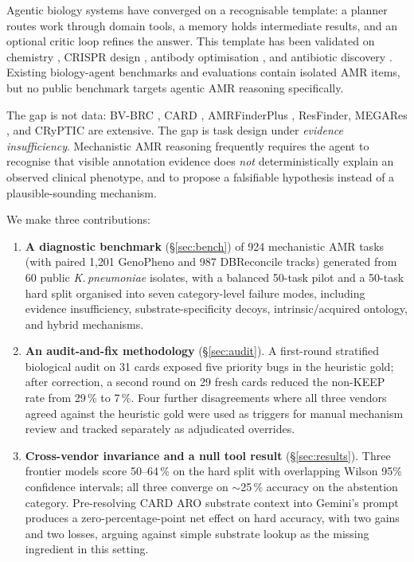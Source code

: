 \documentclass{article}
\begin{document}
Agentic biology systems
\cite{coscientist,chemcrow,biomni,virtuallab,robin,saga,cocientist,txagent}
have converged on a recognisable template: a planner routes work through
domain tools, a memory holds intermediate results, and an optional critic
loop refines the answer. This template has been validated on chemistry
\cite{chemcrow}, CRISPR design \cite{biodiscoveryagent}, antibody
optimisation \cite{virtuallab}, and antibiotic discovery
\cite{saga}. Existing biology-agent benchmarks and evaluations
\cite{labbench,bixbench,biomni,scienceagentbench,bioplanner,astabench,genentech_agentic_compbio}
contain isolated AMR items, but no public benchmark targets agentic AMR
reasoning specifically.

The gap is not data: BV-BRC \cite{bvbrc}, CARD \cite{card}, AMRFinderPlus
\cite{amrfinder}, ResFinder, MEGARes \cite{megares}, and CRyPTIC are
extensive. The gap is task design under \emph{evidence insufficiency}.
Mechanistic AMR reasoning frequently requires the agent to recognise that
visible annotation evidence does \emph{not} deterministically explain an
observed clinical phenotype, and to propose a falsifiable hypothesis instead
of a plausible-sounding mechanism.

We make three contributions:

\begin{enumerate}\itemsep0.1em
\item \textbf{A diagnostic benchmark} (\S\ref{sec:bench}) of 924 mechanistic
AMR tasks (with paired 1{,}201 GenoPheno and 987 DBReconcile tracks) generated
from 60 public \emph{K.\,pneumoniae} isolates, with a balanced 50-task pilot
and a 50-task hard split organised into seven category-level failure modes,
including evidence insufficiency, substrate-specificity decoys,
intrinsic/acquired ontology, and hybrid mechanisms.
\item \textbf{An audit-and-fix methodology} (\S\ref{sec:audit}). A first-round
stratified biological audit on 31 cards exposed five priority bugs in the
heuristic gold; after correction, a second round on 29 fresh cards reduced
the non-KEEP rate from 29\,\% to 7\,\%. Four further disagreements where all
three vendors agreed against the heuristic gold were used as triggers for
manual mechanism review and tracked separately as adjudicated overrides.
\item \textbf{Cross-vendor invariance and a null tool result} (\S\ref{sec:results}).
Three frontier models score 50--64\,\% on the hard split with overlapping
Wilson 95\% confidence intervals; all three converge on $\sim$25\,\%
accuracy on the abstention category. Pre-resolving CARD ARO substrate
context into Gemini's prompt produces a zero-percentage-point net effect on
hard accuracy, with two gains and two losses, arguing against simple
substrate lookup as the missing ingredient in this setting.
\end{enumerate}
\end{document}
